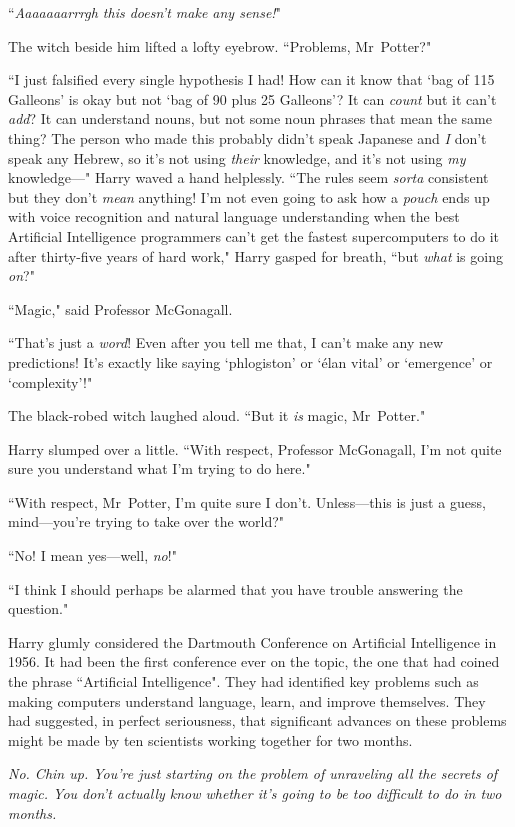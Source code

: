 ``\emph{Aaaaaaarrrgh this doesn't make any sense!}"

The witch beside him lifted a lofty eyebrow. ``Problems, Mr~Potter?"

``I just falsified every single hypothesis I had! How can it know that `bag of 115 Galleons' is okay but not `bag of 90 plus 25 Galleons'? It can \emph{count} but it can't \emph{add}? It can understand nouns, but not some noun phrases that mean the same thing? The person who made this probably didn't speak Japanese and \emph{I} don't speak any Hebrew, so it's not using \emph{their} knowledge, and it's not using \emph{my} knowledge—" Harry waved a hand helplessly. ``The rules seem \emph{sorta} consistent but they don't \emph{mean} anything! I'm not even going to ask how a \emph{pouch} ends up with voice recognition and natural language understanding when the best Artificial Intelligence programmers can't get the fastest supercomputers to do it after thirty-five years of hard work," Harry gasped for breath, ``but \emph{what} is going \emph{on}?"

``Magic," said Professor McGonagall.

``That's just a \emph{word}! Even after you tell me that, I can't make any new predictions! It's exactly like saying `phlogiston' or `élan vital' or `emergence' or `complexity'!"

The black-robed witch laughed aloud. ``But it \emph{is} magic, Mr~Potter."

Harry slumped over a little. ``With respect, Professor McGonagall, I'm not quite sure you understand what I'm trying to do here."

``With respect, Mr~Potter, I'm quite sure I don't. Unless—this is just a guess, mind—you're trying to take over the world?"

``No! I mean yes—well, \emph{no}!"

``I think I should perhaps be alarmed that you have trouble answering the question."

Harry glumly considered the Dartmouth Conference on Artificial Intelligence in 1956. It had been the first conference ever on the topic, the one that had coined the phrase ``Artificial Intelligence". They had identified key problems such as making computers understand language, learn, and improve themselves. They had suggested, in perfect seriousness, that significant advances on these problems might be made by ten scientists working together for two months.

\emph{No. Chin up. You're just \emph{starting} on the problem of unraveling all the secrets of magic. You don't actually \emph{know} whether it's going to be too difficult to do in two months.}

